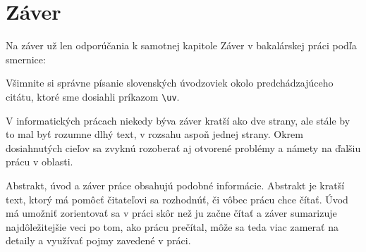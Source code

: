 \chapter*{Záver}  %

Na záver už len odporúčania k samotnej kapitole Záver v bakalárskej
práci podľa smernice:  

Všimnite si správne písanie slovenských úvodzoviek okolo
predchádzajúceho citátu, ktoré sme dosiahli príkazom \verb'\uv'.

V informatických prácach niekedy býva záver kratší ako dve strany, ale
stále by to mal byť rozumne dlhý text, v rozsahu aspoň jednej strany.
Okrem dosiahnutých cieľov sa zvyknú rozoberať aj otvorené problémy a
námety na ďalšiu prácu v oblasti.

Abstrakt, úvod a záver práce obsahujú podobné informácie. Abstrakt je
kratší text, ktorý má pomôcť čitateľovi sa rozhodnúť, či vôbec prácu
chce čítať. Úvod má umožniť zorientovať sa v práci skôr než ju začne
čítať a záver sumarizuje najdôležitejšie veci po tom, ako prácu
prečítal, môže sa teda viac zamerať na detaily a využívať pojmy
zavedené v práci.


